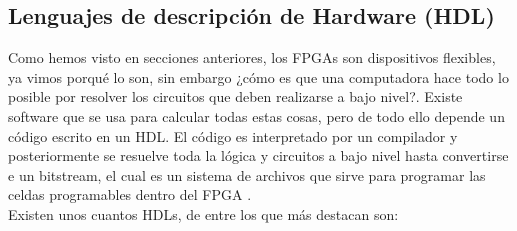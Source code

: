 \documentclass[twoside,spanish,ESP,MSc]{plantillaLabUPV}
\theoremstyle{definition}
\newcommand{\f}{FPGA }
\newcommand{\fs}{FPGAs }
\begin{document}
\subsection{Lenguajes de descripción de Hardware (HDL)}

Como hemos visto en secciones anteriores, los \fs son dispositivos flexibles, ya vimos porqué lo son, sin embargo ¿cómo es que una computadora hace todo lo posible por resolver los circuitos que deben realizarse a bajo nivel?. Existe software que se usa para calcular todas estas cosas, pero de todo ello depende un código escrito en un HDL. El código es interpretado por un compilador y posteriormente se resuelve toda la lógica y circuitos a bajo nivel hasta convertirse e un bitstream, el cual es un sistema de archivos que sirve para programar las celdas programables dentro del \f.\\

Existen unos cuantos HDLs, de entre los que más destacan son:
\end{document}
